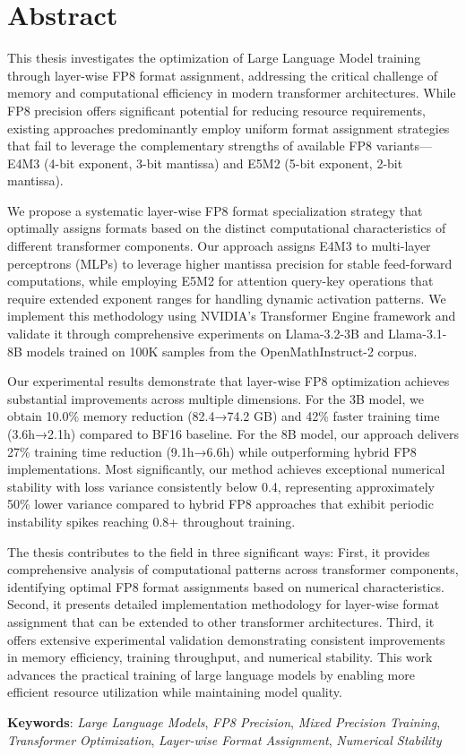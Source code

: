 \chapter*{Abstract}

This thesis investigates the optimization of Large Language Model training through layer-wise FP8 format assignment, addressing the critical challenge of memory and computational efficiency in modern transformer architectures. While FP8 precision offers significant potential for reducing resource requirements, existing approaches predominantly employ uniform format assignment strategies that fail to leverage the complementary strengths of available FP8 variants—E4M3 (4-bit exponent, 3-bit mantissa) and E5M2 (5-bit exponent, 2-bit mantissa).

We propose a systematic layer-wise FP8 format specialization strategy that optimally assigns formats based on the distinct computational characteristics of different transformer components. Our approach assigns E4M3 to multi-layer perceptrons (MLPs) to leverage higher mantissa precision for stable feed-forward computations, while employing E5M2 for attention query-key operations that require extended exponent ranges for handling dynamic activation patterns. We implement this methodology using NVIDIA's Transformer Engine framework and validate it through comprehensive experiments on Llama-3.2-3B and Llama-3.1-8B models trained on 100K samples from the OpenMathInstruct-2 corpus.

Our experimental results demonstrate that layer-wise FP8 optimization achieves substantial improvements across multiple dimensions. For the 3B model, we obtain 10.0\% memory reduction (82.4→74.2 GB) and 42\% faster training time (3.6h→2.1h) compared to BF16 baseline. For the 8B model, our approach delivers 27\% training time reduction (9.1h→6.6h) while outperforming hybrid FP8 implementations. Most significantly, our method achieves exceptional numerical stability with loss variance consistently below 0.4, representing approximately 50\% lower variance compared to hybrid FP8 approaches that exhibit periodic instability spikes reaching 0.8+ throughout training.

The thesis contributes to the field in three significant ways: First, it provides comprehensive analysis of computational patterns across transformer components, identifying optimal FP8 format assignments based on numerical characteristics. Second, it presents detailed implementation methodology for layer-wise format assignment that can be extended to other transformer architectures. Third, it offers extensive experimental validation demonstrating consistent improvements in memory efficiency, training throughput, and numerical stability. This work advances the practical training of large language models by enabling more efficient resource utilization while maintaining model quality.

\textbf{Keywords}: \textit{Large Language Models}, \textit{FP8 Precision}, \textit{Mixed Precision Training}, \textit{Transformer Optimization}, \textit{Layer-wise Format Assignment}, \textit{Numerical Stability}